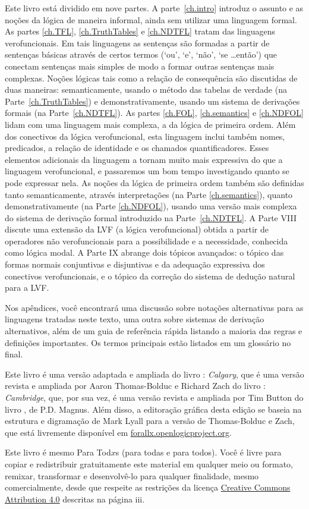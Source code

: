 Este livro está dividido em nove partes.
A parte~\ref{ch.intro} introduz o assunto e as noções da lógica de maneira informal, ainda sem utilizar uma linguagem formal.
As partes \ref{ch.TFL}, \ref{ch.TruthTables} e \ref{ch.NDTFL} tratam das linguagens verofuncionais.  Em tais linguagens as sentenças são formadas a partir de sentenças básicas através de certos termos (`ou', `e', `não', `se \dots então') que conectam sentenças mais simples de modo a formar outras sentenças mais complexas.
Noções lógicas tais como a relação de consequência são discutidas de duas maneiras:
semanticamente, usando o método das tabelas de verdade (na Parte~\ref{ch.TruthTables}) e demonstrativamente, usando um sistema de derivações formais (na Parte~\ref{ch.NDTFL}).
As partes \ref{ch.FOL}, \ref{ch.semantics} e \ref{ch.NDFOL} lidam com uma linguagem mais complexa, a da lógica de primeira ordem.
Além dos conectivos da lógica verofuncional, esta linguagem inclui também nomes, predicados, a relação de identidade e os chamados quantificadores.
Esses elementos adicionais da linguagem a tornam muito mais expressiva do que a linguagem verofuncional, e passaremos um bom tempo investigando quanto se pode expressar nela.
As noções da lógica de primeira ordem também são definidas tanto semanticamente, através interpretações (na Parte \ref{ch.semantics}), quanto demonstrativamente (na Parte \ref{ch.NDFOL}), usando uma versão mais complexa do sistema de derivação formal introduzido na Parte~\ref{ch.NDTFL}.
A Parte VIII discute uma extensão da LVF (a lógica verofuncional) obtida a partir de operadores não verofuncionais para a possibilidade e a necessidade, conhecida como lógica modal.
A Parte IX abrange dois tópicos avançados:
o tópico das formas normais conjuntivas e disjuntivas e da adequação expressiva dos conectivos verofuncionais, e o tópico da correção do sistema de dedução natural para a LVF.

Nos apêndices, você encontrará uma discussão sobre notações alternativas para as linguagens tratadas neste texto, uma outra sobre sistemas de derivação alternativos, além  de um guia de referência rápida listando a maioria das regras e definições importantes.
Os termos principais estão listados em um glossário no final.

Este livro  é uma versão adaptada e ampliada do livro \forallx: \emph{Calgary}, que é uma versão revista e ampliada por Aaron Thomas-Bolduc e Richard Zach do livro \forallx: \emph{Cambridge}, que, por sua vez, é uma versão revista e ampliada por Tim Button do livro \forallx, de P.D. Magnus.
Além disso, a editoração gráfica desta edição se baseia na estrutura e digramação de Mark Lyall para a versão de Thomas-Bolduc e Zach, que está livremente disponível em \hbox{\href{https://forallx.openlogicproject.org}{forallx.openlogicproject.org}}.

Este livro é mesmo Para Tod$x$s (para todas e para todos).
Você é livre para copiar e redistribuir gratuitamente este material em qualquer meio ou formato, remixar, transformar e desenvolvê-lo para qualquer finalidade, mesmo comercialmente, desde que respeite as restrições da licença  \href{https://creativecommons.org/licenses/by/4.0/}{Creative Commons Attribution 4.0} descritas na página iii.


